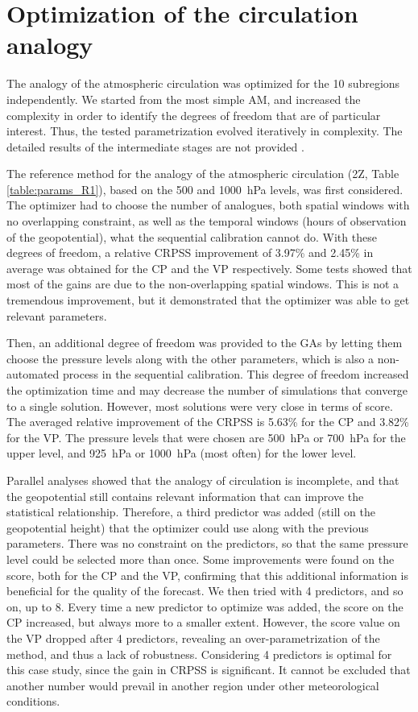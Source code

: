 \documentclass[review]{elsarticle}
\begin{document}
\section{Optimization of the circulation analogy}
\label{sec:optim_circul}

The analogy of the atmospheric circulation was optimized for the 10 subregions  independently. We started from the most simple AM, and increased the complexity in order to identify the degrees of freedom that are of particular interest. Thus, the tested parametrization evolved iteratively in complexity. The detailed results of the intermediate stages are not provided \citep[see][for the details]{Horton2012a}.

The reference method for the analogy of the atmospheric circulation (2Z, Table \ref{table:params_R1}), based on the 500 and 1000~hPa levels, was first considered. The optimizer had to choose the number of analogues, both spatial windows with no overlapping constraint, as well as the temporal windows (hours of observation of the geopotential), what the sequential calibration cannot do. With these degrees of freedom, a relative CRPSS improvement of 3.97\% and 2.45\% in average was obtained for the CP and the VP respectively. Some tests showed that most of the gains are due to the non-overlapping spatial windows. This is not a tremendous improvement, but it demonstrated that the optimizer was able to get relevant parameters.

Then, an additional degree of freedom was provided to the GAs by letting them choose the pressure levels along with the other parameters, which is also a non-automated process in the sequential calibration. This degree of freedom increased the optimization time and may decrease the number of simulations that converge to a single solution. However, most solutions were very close in terms of score. The averaged relative improvement of the CRPSS is 5.63\% for the CP and 3.82\% for the VP. The pressure levels that were chosen are 500~hPa or 700~hPa for the upper level, and 925~hPa or 1000~hPa (most often) for the lower level.

Parallel analyses showed that the analogy of circulation is incomplete, and that the geopotential still contains relevant information that can improve the statistical relationship. Therefore, a third predictor was added (still on the geopotential height) that the optimizer could use along with the previous parameters. There was no constraint on the predictors, so that the same pressure level could be selected more than once. Some improvements were found on the score, both for the CP and the VP, confirming that this additional information is beneficial for the quality of the forecast. We then tried with 4 predictors, and so on, up to 8. Every time a new predictor to optimize was added, the score on the CP increased, but always more to a smaller extent. However, the score value on the VP dropped after 4 predictors, revealing an over-parametrization of the method, and thus a lack of robustness. Considering 4 predictors is optimal for this case study, since the gain in CRPSS is significant. It cannot be excluded that another number would prevail in another region under other meteorological conditions.
\end{document}
